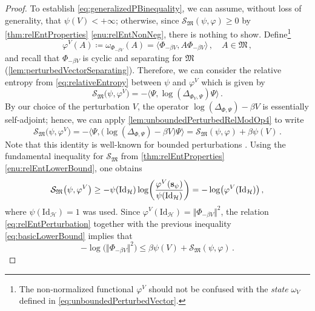 \documentclass[a4paper, twoside, 11pt, reqno]{amsart}
\theoremstyle{definition}
\theoremstyle{plain}
\let\originalleft\left
\let\originalright\right
\renewcommand{\left}{\mathopen{}\mathclose\bgroup\originalleft}
\renewcommand{\right}{\aftergroup\egroup\originalright}
\renewcommand{\Delta}{\varDelta}
\renewcommand{\Phi}{\varPhi}
\renewcommand{\Psi}{\varPsi}
\newcommand{\MH}{\mathcal{H}}
\newcommand{\MS}{\mathcal{S}}
\newcommand{\MFM}{\mathfrak{M}}
\newcommand{\id}{\mathrm{Id}}
\newcommand{\1}{\mathbf{1}}
\newcommand{\ssupp}{\mathbf{s}}
\newcommand{\norm}[2][]{#1\Vert{#2}#1\Vert}
\newcommand{\braket}[2][]{#1\langle{#2}#1\rangle}
\newcommand{\ce}{\coloneqq}
\newcommand{\com}{{\, , \quad}}
\begin{document}
\begin{proof}
    To establish \cref{eq:generalizedPBinequality}, we can assume, without loss of generality, that $\psi(V) < + \infty$; otherwise, since $\MS_\MFM(\psi, \varphi) \ge 0$ by \cref{thm:relEntProperties} \ref{enu:relEntNonNeg}, there is nothing to show. Define\footnote{The non-normalized functional $\varphi^V$ should not be confused with the \emph{state} $\omega_V$ defined in \cref{eq:unboundedPerturbedVector}.}
    \begin{equation*}
        \varphi^V(A) \ce \omega_{\Phi_{-\beta V}}(A) = \braket{\Phi_{-\beta V}, A \Phi_{-\beta V}} \com A \in \MFM \, ,
    \end{equation*}
    and recall that $\Phi_{- \beta V}$ is cyclic and separating for $\MFM$ (\cref{lem:perturbedVectorSeparating}). Therefore, we can consider the relative entropy from \cref{eq:relativeEntropy} between $\psi$ and $\varphi^V$ which is given by
    \begin{equation*}
        \MS_\MFM \bigl(\psi, \varphi^V\bigr) = - \braket[\big]{\Psi, \log (\Delta_{\Phi_V, \Psi}) \Psi} \, .
    \end{equation*}
    By our choice of the perturbation $V$, the operator $\log(\Delta_{\Phi, \Psi}) - \beta V$ is essentially self-adjoint; hence, we can apply \cref{lem:unboundedPerturbedRelModOp4} to write
    \begin{equation}\label{eq:relEntPerturbation}
        \MS_\MFM \bigl(\psi, \varphi^V\bigr) = - \braket[\big]{\Psi, \bigl(\log(\Delta_{\Phi, \Psi}) - \beta V\bigr) \Psi} = \MS_\MFM(\psi, \varphi) + \beta \psi(V) \, .
    \end{equation}
    Note that this identity is well-known for bounded perturbations \cite[Thm. 3.10]{Araki1977}. Using the fundamental inequality for $\MS_\MFM$ from \cref{thm:relEntProperties} \ref{enu:relEntLowerBound}, one obtains
    \begin{equation}\label{eq:basicLowerBound}
        \MS_\MFM \bigl(\psi, \varphi^V\bigr) \ge - \psi(\id_\MH) \log \left(\frac{\varphi^V(\ssupp_\psi)}{\psi(\id_\MH)}\right) = - \log \bigl(\varphi^V(\id_\MH)\bigr) \, ,
    \end{equation}
    where $\psi(\id_\MH) = 1$ was used. Since $\varphi^V(\id_\MH) = \norm{\Phi_{- \beta V}}^2$, the relation \eqref{eq:relEntPerturbation} together with the previous inequality \eqref{eq:basicLowerBound} implies that
    \begin{equation*}
        - \log \bigl(\norm{\Phi_{- \beta V}}^2\bigr) \le \beta \psi(V) + \MS_\MFM(\psi, \varphi) \, .
    \end{equation*}


\end{proof}
\end{document}
